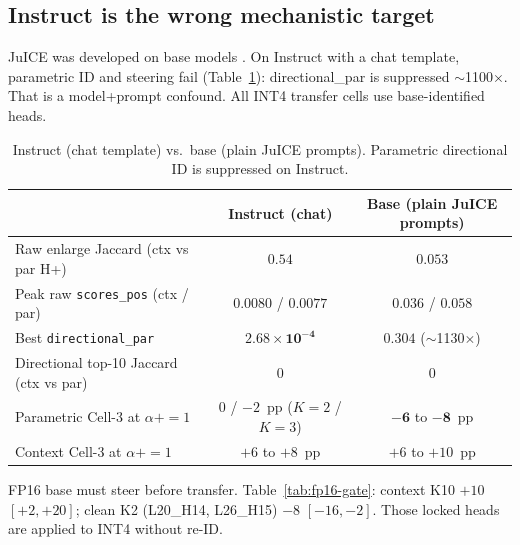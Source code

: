 \documentclass{article} %
\begin{document}
\subsection{Instruct is the wrong mechanistic target}
\label{sec:instruct-base}

JuICE was developed on base models \citep{li2025taming}. On Instruct with a chat template, parametric ID and steering fail (Table~\ref{tab:instruct-base}): directional\_par is suppressed $\sim$1100$\times$. That is a model+prompt confound. All INT4 transfer cells use base-identified heads.

\begin{table}[t]
\caption{Instruct (chat template) vs.\ base (plain JuICE prompts). Parametric directional ID is suppressed on Instruct.}
\label{tab:instruct-base}
\centering
\footnotesize
\setlength{\tabcolsep}{3pt}
\begin{tabular}{p{2.05in}cc}
\toprule
 & Instruct (chat) & Base (plain JuICE prompts) \\
\midrule
Raw enlarge Jaccard (ctx vs par H+) & $\mathbf{0.54}$ & $\mathbf{0.053}$ \\
Peak raw \texttt{scores\_pos} (ctx / par) & $0.0080$ / $0.0077$ & $\mathbf{0.036}$ / $\mathbf{0.058}$ \\
Best \texttt{directional\_par} & $\mathbf{2.68\times 10^{-4}}$ & $\mathbf{0.304}$ ($\sim$1130$\times$) \\
Directional top-10 Jaccard (ctx vs par) & $0$ & $0$ \\
Parametric Cell-3 at $\alpha{+}{=}1$ & $0$ / $-2$~pp ($K{=}2$ / $K{=}3$) & $\mathbf{-6}$ to $\mathbf{-8}$~pp \\
Context Cell-3 at $\alpha{+}{=}1$ & $+6$ to $+8$~pp & $+6$ to $+10$~pp \\
\bottomrule
\end{tabular}
\end{table}

FP16 base must steer before transfer. Table~\ref{tab:fp16-gate}: context K10 $+10$ $[+2,+20]$; clean K2 (L20\_H14, L26\_H15) $-8$ $[-16,-2]$. Those locked heads are applied to INT4 without re-ID.
\end{document}
